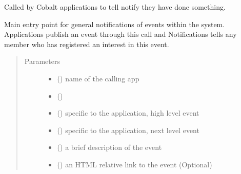 \documentclass[letterpaper,10pt,english]{sphinxmanual}
\begin{document}
\begin{fulllineitems}
\label{\detokenize{notifications:notifications.views.notify_happening}}
Called by Cobalt applications to tell notify they have done something.

Main entry point for general notifications of events within the system.
Applications publish an event through this call and Notifications tells
any member who has registered an interest in this event.
\begin{quote}\begin{description}
\item[{Parameters}] \leavevmode\begin{itemize}
\item {} 
 () \textendash{} name of the calling app

\item {} 
 () \textendash{} 

\item {} 
 () \textendash{} specific to the application, high level event

\item {} 
 () \textendash{} specific to the application, next level event

\item {} 
 () \textendash{} a brief description of the event

\item {} 
 () \textendash{} an HTML relative link to the event (Optional)


\end{itemize}
\end{description}
\end{quote}
\end{fulllineitems}
\end{document}
